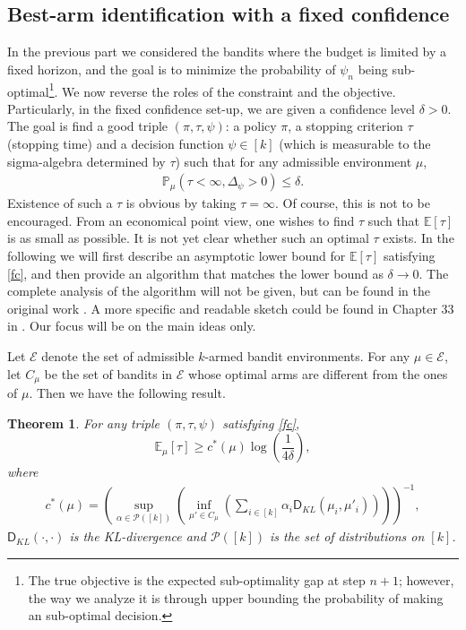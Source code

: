 \documentclass[10pt, openright]{book}
\numberwithin{equation}{section}
\theoremstyle{plain}
\newtheorem{Th}{Theorem}[section]
\theoremstyle{definition}
\def\E{{\mathbb E}}
\def\P{{\mathbb P}}
\begin{document}
\subsection{Best-arm identification with a fixed confidence}

In the previous part we considered the bandits where the budget is limited by a fixed horizon, and the goal is to minimize the probability of $\psi_n$ being sub-optimal\footnote{The true objective is the expected sub-optimality gap at step $n+1$; however, the way we analyze it is through upper bounding the probability of making an sub-optimal decision.}. We now reverse the roles of the constraint and the objective. Particularly, in the fixed confidence set-up, we are given a confidence level $\delta>0$. The goal is find a good triple $(\pi, \tau, \psi)$: a policy $\pi$, a stopping criterion $\tau$ (stopping time) and a decision function $\psi\in [k]$ (which is measurable to the sigma-algebra determined by $\tau$) such that for any admissible environment $\mu$, 
\begin{align}
\P_{\mu}\left(\tau<\infty, \Delta_\psi>0\right)\leq \delta. \label{fc}
\end{align}
Existence of such a $\tau$ is obvious by taking $\tau=\infty$. Of course, this is not to be encouraged. From an economical point view, one wishes to find $\tau$ such that $\E[\tau]$ is as small as possible. It is not yet clear whether such an optimal $\tau$ exists. In the following we will first describe an asymptotic lower bound for $\E[\tau]$ satisfying \eqref{fc}, and then provide an algorithm that matches the lower bound as $\delta\to 0$. The complete analysis of the algorithm will not be given, but can be found in the original work \cite{garivier2016optimal}. A more specific and readable sketch could be found in Chapter 33 in \cite{lattimore2018bandit}. Our focus will be on the main ideas only. 

Let $\mathcal E$ denote the set of admissible $k$-armed bandit environments. For any $\mu\in\mathcal E$, let $C_\mu$ be the set of bandits in $\mathcal E$ whose optimal arms are different from the ones of $\mu$. Then we have the following result. 

\begin{Th}\label{ba:lb}
For any triple $(\pi, \tau, \psi)$ satisfying \eqref{fc}, $$\E_\mu[\tau]\geq c^*(\mu)\log\left(\frac{1}{4\delta}\right),$$ where
\begin{align*}
c^*(\mu)=\left(\sup_{\alpha\in\mathcal P([k])}\left(\inf_{\mu'\in C_\mu}\left(\sum_{i\in [k]}\alpha_i\mathsf D_{KL}(\mu_i, \mu'_i)\right)\right)\right)^{-1},
\end{align*}
$\mathsf D_{KL}(\cdot, \cdot)$ is the KL-divergence and $\mathcal P([k])$ is the set of distributions on $[k]$. 
\end{Th}
\end{document}
